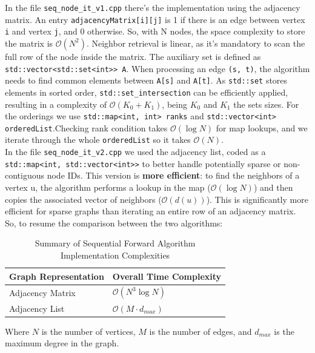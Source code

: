 \documentclass{aes2e}
\begin{document}
In the file \texttt{seq\_node\_it\_v1.cpp} there's the implementation using the adjacency matrix. An entry \texttt{adjacencyMatrix[i][j]} is 1 if there is an edge between vertex \texttt{i} and vertex \texttt{j}, and 0 otherwise. So, with N nodes, the space complexity to store the matrix is $\mathcal{O}\left(N^2\right)$. Neighbor retrieval is linear, as it's mandatory to scan the full row of the node inside the matrix. The auxiliary set is defined as \texttt{std::vector<std::set<int>> A}. When processing an edge \texttt{(s, t)}, the algorithm needs to find common elements between \texttt{A[s]} and \texttt{A[t]}. As \texttt{std::set} stores elements in sorted order, \texttt{std::set\_intersection} can be efficiently applied, resulting in a complexity of $\mathcal{O}\left(K_0 + K_1\right)$, being $K_0$ and $K_1$ the sets sizes. For the orderings we use \texttt{std::map<int, int> ranks} and \texttt{std::vector<int> orderedList}.Checking rank condition takes $\mathcal{O}\left(\log N\right)$ for map lookups, and we iterate through the whole \texttt{orderedList} so it takes $\mathcal{O}\left( N\right)$. \\
In the file \texttt{seq\_node\_it\_v2.cpp} we used the adjacency list, coded as a \texttt{std::map<int, std::vector<int>>} to better handle potentially sparse or non-contiguous node IDs. This version is \textbf{more efficient}: to find the neighbors of a vertex u, the algorithm performs a lookup in the map ($\mathcal{O}\left(\log N\right)$) and then copies the associated vector of neighbors ($\mathcal{O}\left( d(u)\right)$). This is significantly more efficient for sparse graphs than iterating an entire row of an adjacency matrix. \\
So, to resume the comparison between the two algorithms:
\begin{table}[htbp]
    \centering
    \caption{Summary of Sequential Forward Algorithm Implementation Complexities}
    \label{tab:forward_complexity_summary}
    \begin{tabular}{|l|l|}
        \hline
        \textbf{Graph Representation} & \textbf{Overall Time Complexity} \\
        \hline
        Adjacency Matrix & $\mathcal{O}(N^3 \log N)$ \\
        Adjacency List & $\mathcal{O}(M \cdot d_{max})$ \\
        \hline
    \end{tabular}
    \vspace{0.5em} %
    \small
    Where $N$ is the number of vertices, $M$ is the number of edges, and $d_{max}$ is the maximum degree in the graph.
\end{table}
\end{document}

